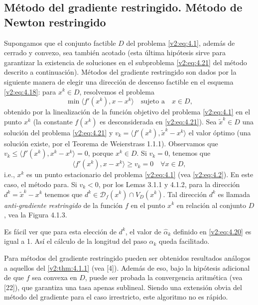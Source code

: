 
\subsection{Método del gradiente restringido. Método de Newton restringido}

Supongamos que el conjunto factible $D$ del problema \eqref{v2:eq:4.1}, además de cerrado y convexo, sea también acotado (esta última hipótesis sirve para garantizar la existencia de soluciones en el subproblema \eqref{v2:eq:4.21} del método descrito a continuación). Métodos del gradiente restringido son dados por la siguiente manera de elegir una dirección de descenso factible en el esquema \eqref{v2:eq:4.18}: para $x^k \in D$, resolvemos el problema
\begin{equation}
    \min \langle f'(x^k), x - x^k \rangle \quad \text{sujeto a} \quad x \in D,
    \label{v2:eq:4.21}
\end{equation}
obtenido por la linealización de la función objetivo del problema \eqref{v2:eq:4.1} en el punto $x^k$ (la constante $f(x^k)$ es desconsiderada en \eqref{v2:eq:4.21}). Sea $\tilde{x}^k \in D$ una solución del problema \eqref{v2:eq:4.21} y $v_k = \langle f'(x^k), \tilde{x}^k - x^k \rangle$ el valor óptimo (una solución existe, por el Teorema de Weierstrass 1.1.1). Observamos que $v_k \le \langle f'(x^k), x^k - x^k \rangle = 0$, porque $x^k \in D$. Si $v_k = 0$, tenemos que
\[
    \langle f'(x^k), x - x^k \rangle \ge v_k = 0 \quad \forall x \in D,
\]
i.e., $x^k$ es un punto estacionario del problema \eqref{v2:eq:4.1} (vea \eqref{v2:eq:4.2}). En este caso, el método para. Si $v_k < 0$, por los Lemas 3.1.1 y 4.1.2, para la dirección $d^k = \tilde{x}^k - x^k$ tenemos que $d^k \in \mathcal{D}_f(x^k) \cap V_D(x^k)$. Tal dirección $d^k$ es llamada \textit{anti-gradiente restringido} de la función $f$ en el punto $x^k$ en relación al conjunto $D$, vea la Figura 4.1.3.


Es fácil ver que para esta elección de $d^k$, el valor de $\hat{\alpha}_k$ definido en \eqref{v2:eq:4.20} es igual a 1. Así el cálculo de la longitud del paso $\alpha_k$ queda facilitado.

Para métodos del gradiente restringido pueden ser obtenidos resultados análogos a aquellos del \cref{v2:thm:4.1.1} (vea [4]). Además de eso, bajo la hipótesis adicional de que $f$ sea convexa en $D$, puede ser probada la convergencia aritmética (vea [22]), que garantiza una tasa apenas sublineal. Siendo una extensión obvia del método del gradiente para el caso irrestricto, este algoritmo no es rápido.

